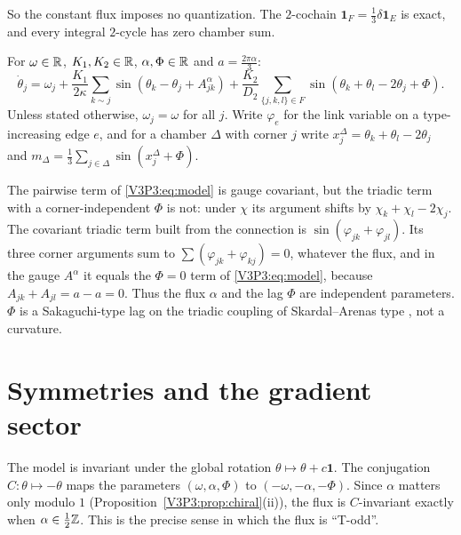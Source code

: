 So the constant flux imposes no quantization. The $2$-cochain $\mathbf 1_F=\frac13\delta\mathbf
1_E$ is exact, and every integral $2$-cycle has zero chamber sum.

\begin{definition}\label{V3P3:def:model}
For $\omega\in\mathbb{R}$, $K_1,K_2\in\mathbb{R}$, $\alpha,\Phi\in\mathbb{R}$ and $a=\frac{2\pi\alpha}{3}$:
\begin{equation}\label{V3P3:eq:model}
\dot\theta_j=\omega_j+\frac{K_1}{2\kappa}\sum_{k\sim j}\sin(\theta_k-\theta_j+A^{\alpha}_{jk})
+\frac{K_2}{D_2}\sum_{\{j,k,l\}\in F}\sin(\theta_k+\theta_l-2\theta_j+\Phi).
\end{equation}
Unless stated otherwise, $\omega_j=\omega$ for all $j$. Write $\varphi_e$ for the link variable on a
type-increasing edge $e$, and for a chamber $\Delta$ with corner $j$ write
$x^{\Delta}_j=\theta_k+\theta_l-2\theta_j$ and $m_\Delta=\frac13\sum_{j\in\Delta}
\sin(x^{\Delta}_j+\Phi)$.
\end{definition}

\begin{remark}\label{V3P3:rem:lag}
The pairwise term of \eqref{V3P3:eq:model} is gauge covariant, but the triadic term with a
corner-independent $\Phi$ is not: under $\chi$ its argument shifts by
$\chi_k+\chi_l-2\chi_j$. The covariant triadic term built from the connection is
$\sin(\varphi_{jk}+\varphi_{jl})$. Its three corner arguments sum to
$\sum(\varphi_{jk}+\varphi_{kj})=0$, whatever the flux, and in the gauge $A^{\alpha}$ it
equals the $\Phi=0$ term of \eqref{V3P3:eq:model}, because $A_{jk}+A_{jl}=a-a=0$. Thus the
flux $\alpha$ and the lag $\Phi$ are independent parameters. $\Phi$ is a Sakaguchi-type lag
\cite{SK86} on the triadic coupling of Skardal--Arenas type \cite{SA19}, not a curvature.
\end{remark}

\section{Symmetries and the gradient sector}\label{V3P3:sec:gradient}

The model is invariant under the global rotation $\theta\mapsto\theta+c\mathbf 1$. The
conjugation $C\colon\theta\mapsto-\theta$ maps the parameters $(\omega,\alpha,\Phi)$ to
$(-\omega,-\alpha,-\Phi)$. Since $\alpha$ matters only modulo $1$
(Proposition~\ref{V3P3:prop:chiral}(ii)), the flux is $C$-invariant exactly when
$\alpha\in\frac12\mathbb{Z}$. This is the precise sense in which the flux is ``T-odd''.

